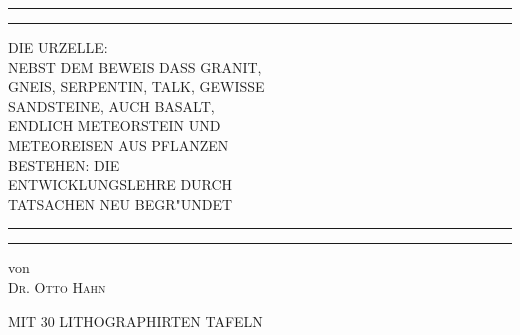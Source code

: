 \documentclass[a4paper, 11pt, oneside, german]{article}
\begin{document}
\begin{titlepage} %
	\centering %
	\scshape %

	
	\rule{\textwidth}{1.6pt}\vspace*{-\baselineskip}\vspace*{2pt} %
	\rule{\textwidth}{0.4pt} %
	
	\vspace{0.75\baselineskip} %
	
	{\LARGE DIE URZELLE:\\}
	\vspace{0.75\baselineskip}
	{\large NEBST DEM BEWEIS DASS GRANIT,\\ GNEIS, SERPENTIN, TALK, GEWISSE\\ SANDSTEINE, AUCH BASALT,\\ ENDLICH METEORSTEIN UND\\ METEOREISEN AUS PFLANZEN\\ BESTEHEN: DIE\\ ENTWICKLUNGSLEHRE DURCH\\ TATSACHEN NEU BEGR"UNDET\\} %
	
	\vspace{0.75\baselineskip} %
	
	\rule{\textwidth}{0.4pt}\vspace*{-\baselineskip}\vspace{3.2pt} %
	\rule{\textwidth}{1.6pt} %
	
	\vspace{1\baselineskip} %
	
	
	{von\\ \scshape\Large Dr. Otto Hahn\\} %
	
	\vspace*{1\baselineskip} %
	
    {\small MIT 30 LITHOGRAPHIRTEN TAFELN} %
    

\end{titlepage}
\end{document}
